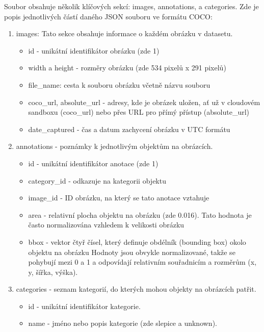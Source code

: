 Soubor obsahuje několik klíčových sekcí: images, annotations, a categories.\newline
Zde je popis jednotlivých částí daného JSON souboru ve formátu COCO:
\begin{enumerate}
    \item images: Tato sekce obsahuje informace o každém obrázku v datasetu.
    \begin{itemize}
        \item[] id - unikátní identifikátor obrázku (zde 1)
        \item[] width a height - rozměry obrázku (zde 534 pixelů x 291 pixelů)
        \item[] file\_name: cesta k souboru obrázku včetně názvu souboru
        \item[] coco\_url, absolute\_url - adresy, kde je obrázek uložen, ať už v cloudovém sandboxu (coco\_url) nebo přes URL pro přímý přístup (absolute\_url)
        \item[] date\_captured - čas a datum zachycení obrázku v UTC formátu
    \end{itemize}
    \item annotations - poznámky k jednotlivým objektům na obrázcích.
    \begin{itemize}
        \item[] id - unikátní identifikátor anotace (zde 1)
        \item[] category\_id - odkazuje na kategorii objektu
        \item[] image\_id - ID obrázku, na který se tato anotace vztahuje
        \item[] area - relativní plocha objektu na obrázku (zde 0.016).
        Tato hodnota je často normalizována vzhledem k velikosti obrázku
        \item[] bbox - vektor čtyř čísel, který definuje obdélník (bounding box) okolo objektu na obrázku
        Hodnoty jsou obvykle normalizované, takže se pohybují mezi 0 a 1 a odpovídají relativním souřadnicím a rozměrům (x, y, šířka, výška).
    \end{itemize}
    \item categories - seznam kategorií, do kterých mohou objekty na obrázcích patřit.
    \begin{itemize}
        \item id - unikátní identifikátor kategorie.
        \item name - jméno nebo popis kategorie (zde slepice a unknown).
    \end{itemize}
\end{enumerate}

